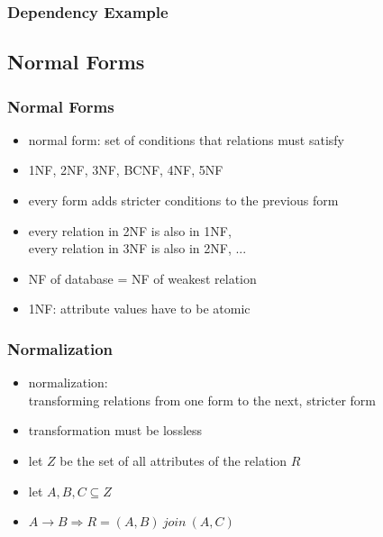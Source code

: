 \documentclass[dvipsnames]{beamer}
\begin{document}
\begin{frame}
  \frametitle{Dependency Example}

  \begin{center}
  \end{center}
\end{frame}

\subsection{Normal Forms}

\begin{frame}
  \frametitle{Normal Forms}

  \begin{itemize}
    \item \alert{normal form}: set of conditions that relations must satisfy

    \medskip
    \item 1NF, 2NF, 3NF, BCNF, 4NF, 5NF
    \item every form adds stricter conditions to the previous form
    \item every relation in 2NF is also in 1NF,\\
      every relation in 3NF is also in 2NF, ...
    \item NF of database = NF of weakest relation

    \pause
    \medskip
    \item \alert{1NF}: attribute values have to be atomic
  \end{itemize}
\end{frame}

\begin{frame}
  \frametitle{Normalization}

  \begin{itemize}
    \item \alert{normalization}:\\
      transforming relations from one form to the next, stricter form

    \item transformation must be lossless
  \end{itemize}

  \pause
  \begin{theorem}[Heath]
    \begin{itemize}
      \item let $Z$ be the set of all attributes of the relation $R$
      \item let $A,B,C \subseteq Z$

      \medskip
      \item $A \rightarrow B \Rightarrow R = (A,B) ~join~ (A,C)$
    \end{itemize}
  \end{theorem}
\end{frame}
\end{document}
